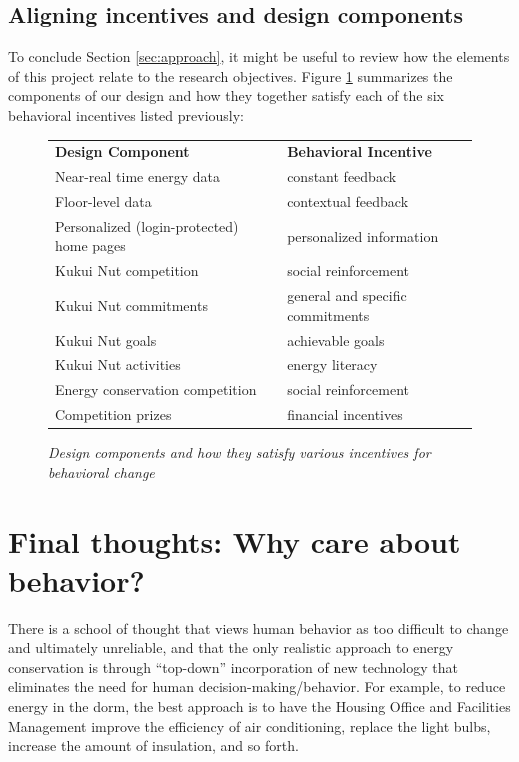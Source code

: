\documentclass[11pt]{article}
\begin{document}
\subsection{Aligning incentives and design components}

To conclude Section \ref{sec:approach}, it might be useful to review how the
elements of this project relate to the research objectives.  Figure
\ref{fig:incentives} summarizes the components of our design and how they
together satisfy each of the six behavioral incentives listed previously:

\begin{figure}[!ht]
\small
\begin{tabular}{p{3in}p{3in}} \hline
{\bf Design Component} & {\bf Behavioral Incentive}  \\
Near-real time energy data & constant feedback \\
Floor-level data & contextual feedback  \\
Personalized (login-protected) home pages  & personalized information \\
Kukui Nut competition & social reinforcement \\ 
Kukui Nut commitments & general and specific commitments \\
Kukui Nut goals & achievable goals \\ 
Kukui Nut activities & energy literacy \\ 
Energy conservation competition & social reinforcement \\
Competition prizes & financial incentives  \\ \hline
\end{tabular}
\normalsize
\caption{{\em Design components and how they satisfy various incentives for behavioral change}}
\label{fig:incentives}
\end{figure}

\section{Final thoughts: Why care about behavior?}

There is a school of thought that views human behavior as too difficult to
change and ultimately unreliable, and that the only realistic approach to
energy conservation is through ``top-down'' incorporation of new technology
that eliminates the need for human decision-making/behavior.  For example,
to reduce energy in the dorm, the best approach is to have the Housing
Office and Facilities Management improve the efficiency of air
conditioning, replace the light bulbs, increase the amount of insulation,
and so forth.
\end{document}
